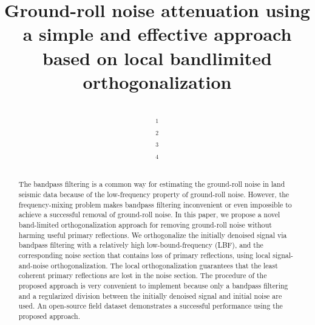 \title{Ground-roll noise attenuation using a simple and effective approach based on local bandlimited orthogonalization}
\renewcommand{\thefootnote}{\fnsymbol{footnote}}
\author{\\
$^1$\\
$^2$ \\
$^3$ \\
$^4$\\
}
\maketitle

\newcommand{\dlo}[1]{}
\newcommand{\wen}[1]{#1}    


\begin{abstract}
 The bandpass filtering is a common way for estimating the ground-roll noise in land seismic data because of the low-frequency property of ground-roll noise. However, the frequency-mixing problem makes bandpass filtering inconvenient or even impossible to achieve a successful removal of ground-roll noise.  In this paper, we propose a novel band-limited orthogonalization approach for removing ground-roll noise without harming useful primary reflections. We orthogonalize the initially denoised signal via bandpass filtering with a relatively high low-bound-frequency (LBF), and the corresponding noise section that contains loss of primary reflections, using local signal-and-noise orthogonalization.  The local orthogonalization guarantees that the least coherent primary reflections are lost in the noise section. The procedure of the proposed approach is very convenient to implement because only a bandpass filtering and a regularized division between the initially denoised signal and initial noise are used. An open-source field dataset demonstrates a successful performance using the proposed approach. 
\end{abstract}

